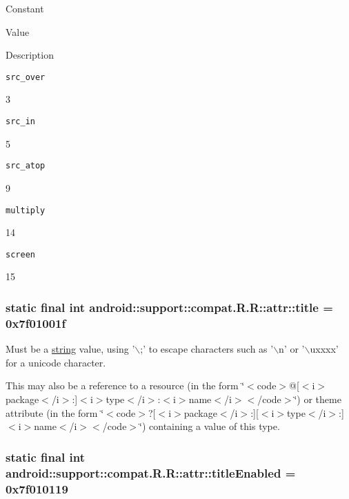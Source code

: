 Constant

Value

Description 

{\tt src\_\-over}

3

{\tt src\_\-in}

5

{\tt src\_\-atop}

9

{\tt multiply}

14

{\tt screen}

15\hypertarget{classandroid_1_1support_1_1compat_1_1_r_1_1attr_4774ca8dff808633d865179495efe189}{
\subsubsection[{title}]{\setlength{\rightskip}{0pt plus 5cm}static final int android::support::compat.R.R::attr::title = 0x7f01001f}}
\label{classandroid_1_1support_1_1compat_1_1_r_1_1attr_4774ca8dff808633d865179495efe189}


Must be a \hyperlink{classandroid_1_1support_1_1compat_1_1_r_1_1string}{string} value, using '$\backslash$;' to escape characters such as '$\backslash$n' or '$\backslash$uxxxx' for a unicode character. 

This may also be a reference to a resource (in the form \char`\"{}$<$code$>$@\mbox{[}$<$i$>$package$<$/i$>$:\mbox{]}$<$i$>$type$<$/i$>$:$<$i$>$name$<$/i$>$$<$/code$>$\char`\"{}) or theme attribute (in the form \char`\"{}$<$code$>$?\mbox{[}$<$i$>$package$<$/i$>$:\mbox{]}\mbox{[}$<$i$>$type$<$/i$>$:\mbox{]}$<$i$>$name$<$/i$>$$<$/code$>$\char`\"{}) containing a value of this type. \hypertarget{classandroid_1_1support_1_1compat_1_1_r_1_1attr_455ce6d99cadd7ae4b01fa6cd214e203}{
\subsubsection[{titleEnabled}]{\setlength{\rightskip}{0pt plus 5cm}static final int android::support::compat.R.R::attr::titleEnabled = 0x7f010119}}
\label{classandroid_1_1support_1_1compat_1_1_r_1_1attr_455ce6d99cadd7ae4b01fa6cd214e203}


